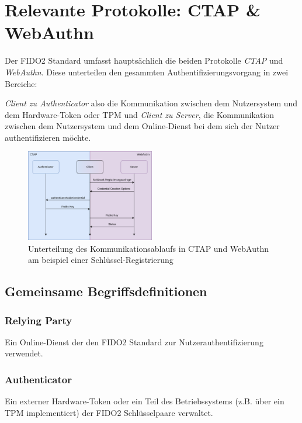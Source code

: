 \documentclass[journal]{IEEEtran}
\begin{document}
\section{Relevante Protokolle: CTAP \& WebAuthn}

Der FIDO2 Standard umfasst hauptsächlich die beiden Protokolle \textit{CTAP}
und \textit{WebAuthn}. Diese unterteilen den gesammten
Authentifizierungsvorgang in
zwei Bereiche:

\textit{Client zu Authenticator} also die Kommunikation zwischen dem
Nutzersystem und dem Hardware-Token oder TPM und \textit{Client zu Server}, die
Kommunikation zwischen dem Nutzersystem und dem Online-Dienst bei dem sich der
Nutzer authentifizieren möchte.

\begin{figure}[ht]
	\includegraphics[width=0.5\textwidth]{ctap-webauthn-registration.png}
	\centering
	\caption{Unterteilung des Kommunikationsablaufs in CTAP und WebAuthn am
	beispiel einer Schlüssel-Registrierung}\label{fig:ctap-webauthn}
\end{figure}

\subsection{Gemeinsame Begriffsdefinitionen}

\subsubsection{Relying Party}

Ein Online-Dienst der den FIDO2 Standard zur Nutzerauthentifizierung verwendet.

\subsubsection{Authenticator}

Ein externer Hardware-Token oder ein Teil des Betriebssystems (z.B. über ein
TPM implementiert) der FIDO2 Schlüsselpaare verwaltet.
\end{document}
